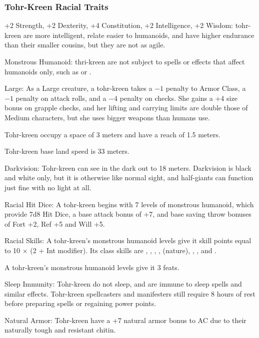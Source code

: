 \subsubsection{Tohr-Kreen Racial Traits}
\begin{itemize*}
    \item +2 Strength, +2 Dexterity, +4 Constitution, +2 Intelligence, +2 Wisdom: tohr-kreen are more intelligent, relate easier to humanoids, and have higher endurance than their smaller cousins, but they are not as agile.
    \item Monstrous Humanoid: thri-kreen are not subject to spells or effects that affect humanoids only, such as  or .
    \item Large: As a Large creature, a tohr-kreen takes a $-1$ penalty to Armor Class, a $-1$ penalty on attack rolls, and a $-4$ penalty on  checks. She gains a +4 size bonus on grapple checks, and her lifting and carrying limits are double those of Medium characters, but she uses bigger weapons than humans use.
    \item Tohr-kreen occupy a space of 3 meters and have a reach of 1.5 meters.
    \item Tohr-kreen base land speed is 33 meters.
    \item Darkvision: Tohr-kreen can see in the dark out to 18 meters. Darkvision is black and white only, but it is otherwise like normal sight, and half-giants can function just fine with no light at all.
    \item Racial Hit Dice: A tohr-kreen begins with 7 levels of monstrous humanoid, which provide 7d8 Hit Dice, a base attack bonus of +7, and base saving throw bonuses of Fort +2, Ref +5 and Will +5.
    \item Racial Skills: A tohr-kreen's monstrous humanoid levels give it skill points equal to 10 $\times$ (2 + Int modifier). Its class skills are , , , ,  (nature), , , and .
    \item A tohr-kreen's monstrous humanoid levels give it 3 feats.
    \item Sleep Immunity: Tohr-kreen do not sleep, and are immune to sleep spells and similar effects. Tohr-kreen spellcasters and manifesters still require 8 hours of rest before preparing spells or regaining power points.
    \item Natural Armor: Tohr-kreen have a +7 natural armor bonus to AC due to their naturally tough and resistant chitin.

\end{itemize*}
